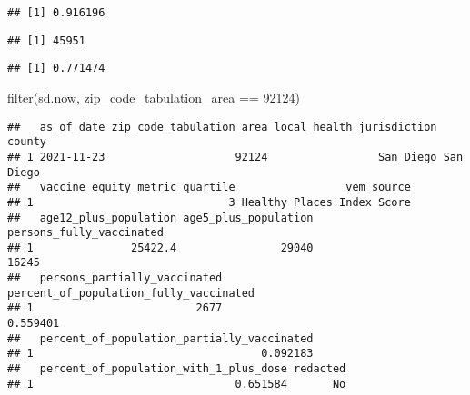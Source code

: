 \documentclass[
]{article}
\newenvironment{Shaded}{\begin{snugshade}}{\end{snugshade}}
\newcommand{\DecValTok}[1]{\textcolor[rgb]{0.00,0.00,0.81}{#1}}
\newcommand{\FunctionTok}[1]{\textcolor[rgb]{0.00,0.00,0.00}{#1}}
\newcommand{\NormalTok}[1]{#1}
\newcommand{\OtherTok}[1]{\textcolor[rgb]{0.56,0.35,0.01}{#1}}
\newcommand{\SpecialCharTok}[1]{\textcolor[rgb]{0.00,0.00,0.00}{#1}}
\begin{document}
\begin{Shaded}
\end{Shaded}

\begin{verbatim}
## [1] 0.916196
\end{verbatim}

\begin{Shaded}
\end{Shaded}

\begin{verbatim}
## [1] 45951
\end{verbatim}

\begin{Shaded}
\end{Shaded}

\begin{verbatim}
## [1] 0.771474
\end{verbatim}

\begin{Shaded}
\begin{Highlighting}[]
\FunctionTok{filter}\NormalTok{(sd.now, zip\_code\_tabulation\_area }\SpecialCharTok{==} \DecValTok{92124}\NormalTok{)}
\end{Highlighting}
\end{Shaded}

\begin{verbatim}
##   as_of_date zip_code_tabulation_area local_health_jurisdiction    county
## 1 2021-11-23                    92124                 San Diego San Diego
##   vaccine_equity_metric_quartile                 vem_source
## 1                              3 Healthy Places Index Score
##   age12_plus_population age5_plus_population persons_fully_vaccinated
## 1               25422.4                29040                    16245
##   persons_partially_vaccinated percent_of_population_fully_vaccinated
## 1                         2677                               0.559401
##   percent_of_population_partially_vaccinated
## 1                                   0.092183
##   percent_of_population_with_1_plus_dose redacted
## 1                               0.651584       No
\end{verbatim}
\end{document}
